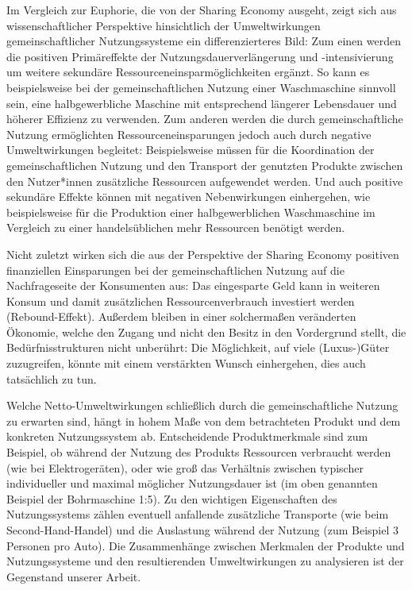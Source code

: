 \documentclass[11pt, titlepage=true]{scrartcl} %
\begin{document}
Im Vergleich zur Euphorie, die von der Sharing Economy ausgeht, zeigt sich aus wissenschaftlicher Perspektive hinsichtlich der Umweltwirkungen gemeinschaftlicher Nutzungssysteme ein differenzierteres Bild: Zum einen werden die positiven Primäreffekte der
Nutzungsdauerverlängerung und -intensivierung um weitere sekundäre
Ressourceneinsparmöglichkeiten ergänzt. So kann es beispielsweise bei der
gemeinschaftlichen Nutzung einer Waschmaschine sinnvoll sein, eine
halbgewerbliche Maschine mit entsprechend längerer Lebensdauer und höherer
Effizienz zu verwenden. Zum anderen werden die durch gemeinschaftliche Nutzung
ermöglichten Ressourceneinsparungen jedoch auch durch negative Umweltwirkungen
begleitet: Beispielsweise müssen für die Koordination der gemeinschaftlichen
Nutzung und den Transport der genutzten Produkte zwischen den Nutzer*innen zusätzliche
Ressourcen aufgewendet werden. Und auch positive sekundäre Effekte können mit negativen Nebenwirkungen einhergehen, wie beispielsweise für die Produktion einer halbgewerblichen Waschmaschine im Vergleich zu einer handelsüblichen
mehr Ressourcen benötigt werden.

Nicht zuletzt wirken sich die aus der Perspektive der Sharing Economy positiven
finanziellen Einsparungen bei der gemeinschaftlichen Nutzung auf die Nachfrageseite der
Konsumenten aus: Das eingesparte Geld kann in weiteren Konsum und damit
zusätzlichen Ressourcenverbrauch investiert werden (Rebound-Effekt). Außerdem
bleiben in einer solchermaßen veränderten Ökonomie, welche den Zugang und nicht
den Besitz in den Vordergrund stellt, die Bedürfnisstrukturen nicht unberührt:
Die Möglichkeit, auf viele (Luxus-)Güter zuzugreifen, könnte mit einem
verstärkten Wunsch einhergehen, dies auch tatsächlich zu tun.

Welche Netto-Umweltwirkungen schließlich durch die gemeinschaftliche Nutzung zu
erwarten sind, hängt in hohem Maße von dem betrachteten Produkt und dem konkreten
Nutzungssystem ab. Entscheidende Produktmerkmale sind zum Beispiel, ob während der Nutzung des Produkts Ressourcen verbraucht werden (wie bei Elektrogeräten), oder wie groß das Verhältnis zwischen typischer individueller und maximal möglicher Nutzungsdauer ist (im oben genannten Beispiel der Bohrmaschine 1:5). Zu den wichtigen Eigenschaften des Nutzungssystems zählen eventuell anfallende zusätzliche Transporte (wie beim Second-Hand-Handel) und die Auslastung während der Nutzung (zum Beispiel 3 Personen pro Auto). Die Zusammenhänge zwischen Merkmalen der Produkte und Nutzungssysteme und den resultierenden Umweltwirkungen zu analysieren ist der Gegenstand unserer Arbeit.
\end{document}
